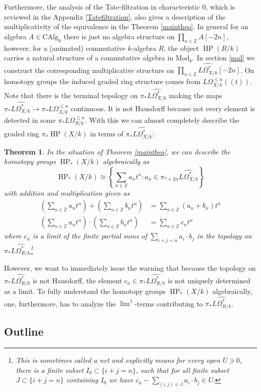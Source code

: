 \documentclass[10pt, reqno]{amsart}
\newtheorem{theorem}{Theorem}[section]
\theoremstyle{definition}
\theoremstyle{remark}
\newcommand{\Z}{\mathbb{Z}}
\newcommand{\CAlg}{\mathrm{CAlg}}
\newcommand{\dr}[3]{\Omega^{#3}_{#1/#2}}
\newcommand{\llrrpar}[1]{(\!(#1)\!)}
\newcommand{\Mod}{\mathrm{Mod}}
\DeclareMathOperator{\HP}{\mathrm{HP}}
\begin{document}
Furthermore, the analysis of the Tate-filtration in characteristic 0, which is reviewed in the Appendix \ref{Tatefiltration}, also gives a description of the multiplicativity of the equivalence in the Theorem \ref{maintheo}.  In general for an algebra $A\in\CAlg_k$ there is just no algebra structure on $\prod_{n\in\Z}A[-2n]$, however, for a (animated) commutative $k$-algebra $R$, the object $\HP(R/k)$ carries a natural structure of a commutative algebra in $\Mod_k$. In section \ref{mal} we construct the corresponding multiplicative structure on $\prod_{n\in\Z}\widehat{L\dr Xk*}[-2n]$. On homotopy groups the induced graded ring structure comes from $L\dr Xk{\leq n}\llrrpar t$. Note that there is the terminal topology on $\pi_*\widehat{L\dr Xk{*}}$ making the maps $\pi_*\widehat{L\dr Xk{*}}\to\pi_*L\dr Xk{\leq n}$ continuous. It is not Hausdorff because not every element is detected in some $\pi_* L\dr Rk{\leq n }$. With this we can almost completely describe the graded ring $\pi_*\HP(X/k)$ in terms of $\pi_*\widehat{L\dr Xk{*}}$:
\begin{theorem}\label{algebrastructure}
	In the situation of Theorem \ref{maintheo}, we can describe the homotopy groups $\HP_*(X/k)$ algebraically as
	\[\HP_*(X/k)\cong\left\{\sum_{n\in\Z}a_nt^n:a_n\in\pi_{*+2n}\widehat{L\dr Xk*}\right\}\]
	with addition and multiplication given as
	\begin{align*}
	\left(\sum_{n\in\Z}a_nt^n\right)+\left(\sum_{n\in\Z}b_nt^n\right)&=\sum_{n\in\Z}(a_n+b_n)t^n\\
	\left(\sum_{n\in\Z}a_nt^n\right)\cdot\left(\sum_{n\in\Z}b_nt^n\right)&=\sum_{n\in\Z}c_nt^n
	\end{align*}
	where $c_n$ is a limit of the finite partial sums of $\sum_{i+j=n}a_i\cdot b_j$ in the topology on $\pi_{*}\widehat{L\dr Rk{*}}$\footnote{This is sometimes called a net and explicitly means for every open $U\ni 0$, there is a finite subset $I_0\subset\{i+j=n\}$, such that for all finite subset $J\subset\{i+j=n\}$ containing $I_0$
	we have $c_n-\sum_{(i,j)\in J}a_i\cdot b_j\in U.$}
\end{theorem}
However, we want to immediately issue the warning that because the topology on $\pi_*\widehat{L\dr Rk*}$ is not Hausdorff, the element $c_n\in\pi_*\widehat{L\dr Rk*}$ is not uniquely determined as a limit. To fully understand the homotopy groups $\HP_*(X/k)$ algebraically, one, furthermore, has to analyze the $\lim^1$-terms contributing to $\pi_*\widehat{L\dr Rk*}$.

\subsection{Outline}
\end{document}
